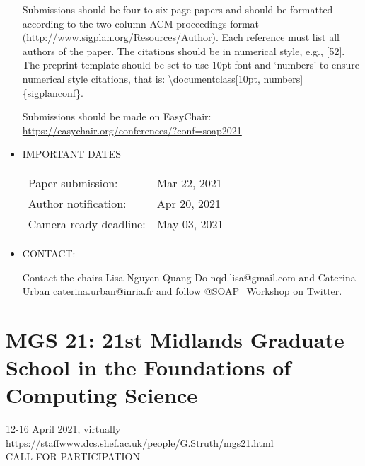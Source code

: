 \documentclass{article}
\begin{document}
\begin{itemize}
  Submissions should be four to six-page papers and should be formatted according to the two-column ACM proceedings format (\href{http://www.sigplan.org/Resources/Author}{http://www.sigplan.org/Resources/Author}). Each reference must list all authors of the paper. The citations should be in numerical style, e.g., [52]. The preprint template should be set to use 10pt font and ‘numbers’ to ensure numerical style citations, that is: \textbackslash{}documentclass[10pt, numbers]\{sigplanconf\}.  
 
  Submissions should be made on EasyChair: \href{https://easychair.org/conferences/?conf=soap2021}{https://easychair.org/conferences/?conf=soap2021} 
 
\item  IMPORTANT DATES 
 
\begin{tabulary}{\linewidth}{LL}Paper submission:  & Mar 22, 2021 \\
Author notification:  & Apr 20, 2021 \\
Camera ready deadline:  & May 03, 2021 \\
\end{tabulary}
 
\item  CONTACT:  
 
  Contact the chairs Lisa Nguyen Quang Do nqd.lisa@gmail.com and Caterina Urban caterina.urban@inria.fr and follow @SOAP\_Workshop on Twitter. 
 
\end{itemize}\section{MGS 21: 21st Midlands Graduate School in the Foundations of Computing Science}\label{MGS21}  12-16 April 2021, virtually\\ 
  \href{https://staffwww.dcs.shef.ac.uk/people/G.Struth/mgs21.html}{https://staffwww.dcs.shef.ac.uk/people/G.Struth/mgs21.html}\\ 
CALL FOR PARTICIPATION 
\end{document}

